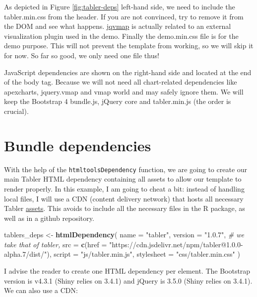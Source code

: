 \documentclass[
]{book}
\newenvironment{Shaded}{\begin{snugshade}}{\end{snugshade}}
\newcommand{\CommentTok}[1]{\textcolor[rgb]{0.56,0.35,0.01}{\textit{#1}}}
\newcommand{\DataTypeTok}[1]{\textcolor[rgb]{0.13,0.29,0.53}{#1}}
\newcommand{\KeywordTok}[1]{\textcolor[rgb]{0.13,0.29,0.53}{\textbf{#1}}}
\newcommand{\NormalTok}[1]{#1}
\newcommand{\StringTok}[1]{\textcolor[rgb]{0.31,0.60,0.02}{#1}}
\begin{document}
As depicted in Figure \ref{fig:tabler-deps} left-hand side, we need to include the tabler.min.css from the header. If you are not convinced, try to remove it from the DOM and see what happens. \href{https://www.10bestdesign.com/jqvmap/}{jqvmap} is actually related to an external visualization plugin used in the demo. Finally the demo.min.css file is for the demo purpose. This will not prevent the template from working, so we will skip it for now. So far so good, we only need one file thus!

JavaScript dependencies are shown on the right-hand side and located at the end of the body tag. Because we will not need all chart-related dependencies like apexcharts, jquery.vmap and vmap world and may safely ignore them. We will keep the Bootstrap 4 bundle.js, jQuery core and tabler.min.js (the order is crucial).

\hypertarget{bundle-dependencies}{%
\section{Bundle dependencies}\label{bundle-dependencies}}

With the help of the \texttt{htmltoolsDependency} function, we are going to create our main Tabler HTML dependency containing all assets to allow our template to render properly. In this example, I am going to cheat a bit: instead of handling local files, I will use a CDN (content delivery network) that hosts all necessary Tabler \href{https://www.jsdelivr.com/package/npm/tabler}{assets}. This avoids to include all the necessary files in the R package, as well as in a github repository.

\begin{Shaded}
\begin{Highlighting}[]
\NormalTok{tablers_deps <-}\StringTok{ }\KeywordTok{htmlDependency}\NormalTok{(}
  \DataTypeTok{name =} \StringTok{"tabler"}\NormalTok{,}
  \DataTypeTok{version =} \StringTok{"1.0.7"}\NormalTok{, }\CommentTok{# we take that of tabler,}
  \DataTypeTok{src =} \KeywordTok{c}\NormalTok{(}\DataTypeTok{href =} \StringTok{"https://cdn.jsdelivr.net/npm/tabler@1.0.0-alpha.7/dist/"}\NormalTok{),}
  \DataTypeTok{script =} \StringTok{"js/tabler.min.js"}\NormalTok{,}
  \DataTypeTok{stylesheet =} \StringTok{"css/tabler.min.css"}
\NormalTok{)}
\end{Highlighting}
\end{Shaded}

I advise the reader to create one HTML dependency per element. The Bootstrap version is v4.3.1 (Shiny relies on 3.4.1) and jQuery is 3.5.0 (Shiny relies on 3.4.1). We can also use a CDN:
\end{document}
